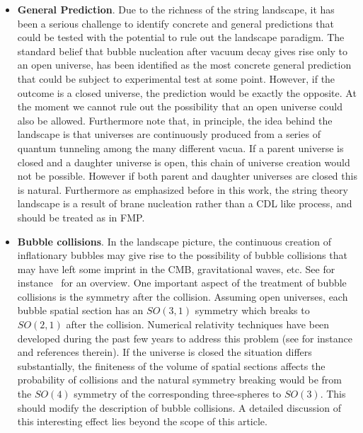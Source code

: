 \documentclass[a4paper,11pt]{article}
\numberwithin{equation}{section}
\begin{document}
\begin{itemize}
\item {\bf General Prediction}. Due to the  richness of the string landscape, it has been a serious challenge to identify concrete and general predictions that could be tested with the potential to rule out the landscape paradigm. The standard belief that bubble nucleation after vacuum decay gives rise only to an open universe, has been identified as the most concrete general prediction that could be subject to experimental test at some point. However, if the outcome is a closed universe, the prediction would be exactly the opposite. At the moment we cannot rule out the possibility that an open universe could also be allowed. Furthermore note that, in principle, the idea behind the landscape is that universes are continuously produced from a series of quantum tunneling among the many different vacua. If a parent universe is closed and a daughter universe is open, this chain of universe creation would not be possible. However if both parent and daughter universes are closed this is natural. Furthermore as emphasized before in this work, the string theory landscape is a result of brane nucleation rather than a CDL like process, and should be treated as in FMP.


\item{\bf Bubble collisions}. In the landscape picture, the continuous creation of inflationary bubbles may give rise to the possibility of bubble collisions that may have left some imprint in the CMB, gravitational waves, etc. See for instance~\cite{Kleban:2011pg, Aguirre:2009ug} for an overview. One important aspect of the treatment of bubble collisions is the symmetry after the collision. Assuming open universes, each bubble spatial section has an $SO(3,1)$ symmetry which breaks to $SO(2,1)$ after the collision. Numerical relativity techniques have been developed during the past few years to address this problem (see for instance~\cite{Johnson:2015gma} and references therein). If the universe is closed the situation differs substantially, the finiteness of the volume of spatial sections affects the probability of collisions and the natural symmetry breaking would be from the $SO(4)$ symmetry of the corresponding three-spheres to $SO(3)$. This should modify the description of  bubble collisions. A detailed discussion of this interesting effect lies beyond the scope of this article.


\end{itemize}
\end{document}
